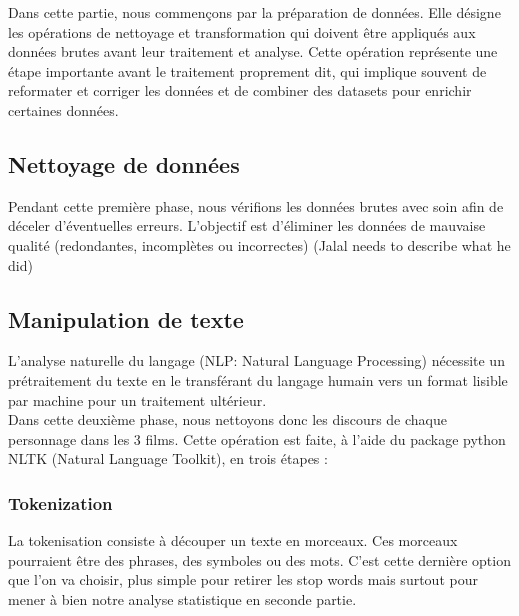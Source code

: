 \documentclass[11pt]{article}
\begin{document}
Dans cette partie, nous commençons par la préparation de données. Elle désigne les opérations de nettoyage et transformation qui doivent être appliqués aux données brutes avant leur traitement et analyse. Cette opération représente une étape importante avant le traitement proprement dit, qui implique souvent de reformater et corriger les données et de combiner des datasets pour enrichir certaines données.

\subsection{Nettoyage de données}

Pendant cette première phase, nous vérifions les données brutes avec soin afin de déceler d’éventuelles erreurs. L’objectif est d’éliminer les données de mauvaise qualité (redondantes, incomplètes ou incorrectes) (Jalal needs to describe what he did)


\subsection{Manipulation de texte}

L'analyse naturelle du langage (NLP: Natural Language Processing) nécessite un prétraitement du texte en le transférant du langage humain vers un format lisible par machine pour un traitement ultérieur.\\

Dans cette deuxième phase, nous nettoyons donc les discours de chaque personnage dans les 3 films. Cette opération est faite, à l'aide du package python NLTK (Natural Language Toolkit), en trois étapes :\\


\subsubsection{Tokenization}

La tokenisation consiste à découper un texte en morceaux. Ces morceaux pourraient être des phrases, des symboles ou des mots. C’est cette dernière option que l’on va choisir, plus simple pour retirer les stop words mais surtout pour mener à bien notre analyse statistique en seconde partie. \\
\end{document}
